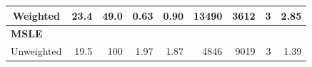 {\begin{landscape}
\begin{table}[]
\begin{tabular}{crrrrrrrr}
Weighted                                                                                                   & 23.4                                                                                   & 49.0                                                                                        & 0.63                                                                            & 0.90                                                                                          & 13490                                                                                     & 3612                                                                                               & 3                                                                                       & 2.85                                                                                   \\ \hline
\multicolumn{9}{l}{\textbf{MSLE}}                                                                                                                                                                                                                                                                                                                                                                                                                                                                                                                                                                                                                                                                                                                                                                                                                                       \\
Unweighted                                                                                                 & 19.5                                                                                   & 100                                                                                         & 1.97                                                                            & 1.87                                                                                          & 4846                                                                                      & 9019                                                                                               & 3                                                                                       & 1.39                                                                                   \\

\end{tabular}
\end{table}
\end{landscape}}
